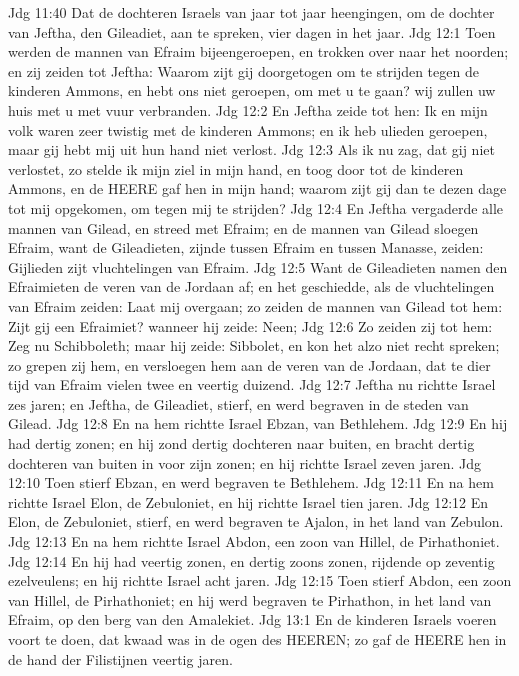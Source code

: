Jdg 11:40  Dat de dochteren Israels van jaar tot jaar heengingen, om de dochter van Jeftha, den Gileadiet, aan te spreken, vier dagen in het jaar.
Jdg 12:1  Toen werden de mannen van Efraim bijeengeroepen, en trokken over naar het noorden; en zij zeiden tot Jeftha: Waarom zijt gij doorgetogen om te strijden tegen de kinderen Ammons, en hebt ons niet geroepen, om met u te gaan? wij zullen uw huis met u met vuur verbranden.
Jdg 12:2  En Jeftha zeide tot hen: Ik en mijn volk waren zeer twistig met de kinderen Ammons; en ik heb ulieden geroepen, maar gij hebt mij uit hun hand niet verlost.
Jdg 12:3  Als ik nu zag, dat gij niet verlostet, zo stelde ik mijn ziel in mijn hand, en toog door tot de kinderen Ammons, en de HEERE gaf hen in mijn hand; waarom zijt gij dan te dezen dage tot mij opgekomen, om tegen mij te strijden?
Jdg 12:4  En Jeftha vergaderde alle mannen van Gilead, en streed met Efraim; en de mannen van Gilead sloegen Efraim, want de Gileadieten, zijnde tussen Efraim en tussen Manasse, zeiden: Gijlieden zijt vluchtelingen van Efraim.
Jdg 12:5  Want de Gileadieten namen den Efraimieten de veren van de Jordaan af; en het geschiedde, als de vluchtelingen van Efraim zeiden: Laat mij overgaan; zo zeiden de mannen van Gilead tot hem: Zijt gij een Efraimiet? wanneer hij zeide: Neen;
Jdg 12:6  Zo zeiden zij tot hem: Zeg nu Schibboleth; maar hij zeide: Sibbolet, en kon het alzo niet recht spreken; zo grepen zij hem, en versloegen hem aan de veren van de Jordaan, dat te dier tijd van Efraim vielen twee en veertig duizend.
Jdg 12:7  Jeftha nu richtte Israel zes jaren; en Jeftha, de Gileadiet, stierf, en werd begraven in de steden van Gilead.
Jdg 12:8  En na hem richtte Israel Ebzan, van Bethlehem.
Jdg 12:9  En hij had dertig zonen; en hij zond dertig dochteren naar buiten, en bracht dertig dochteren van buiten in voor zijn zonen; en hij richtte Israel zeven jaren.
Jdg 12:10  Toen stierf Ebzan, en werd begraven te Bethlehem.
Jdg 12:11  En na hem richtte Israel Elon, de Zebuloniet, en hij richtte Israel tien jaren.
Jdg 12:12  En Elon, de Zebuloniet, stierf, en werd begraven te Ajalon, in het land van Zebulon.
Jdg 12:13  En na hem richtte Israel Abdon, een zoon van Hillel, de Pirhathoniet.
Jdg 12:14  En hij had veertig zonen, en dertig zoons zonen, rijdende op zeventig ezelveulens; en hij richtte Israel acht jaren.
Jdg 12:15  Toen stierf Abdon, een zoon van Hillel, de Pirhathoniet; en hij werd begraven te Pirhathon, in het land van Efraim, op den berg van den Amalekiet.
Jdg 13:1  En de kinderen Israels voeren voort te doen, dat kwaad was in de ogen des HEEREN; zo gaf de HEERE hen in de hand der Filistijnen veertig jaren.
